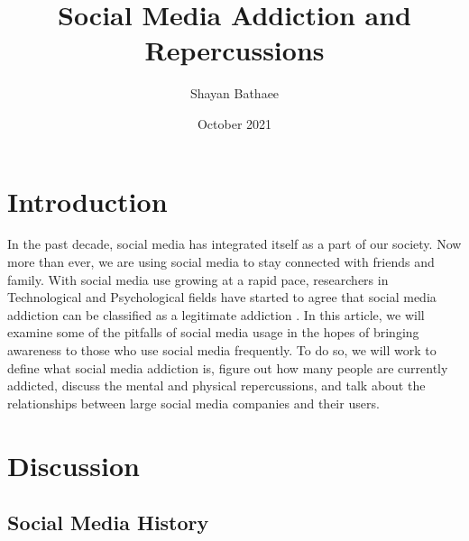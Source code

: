 \documentclass[12pt, journal, compsoc]{IEEEtran}
\title{Social Media Addiction and Repercussions}
\author{Shayan Bathaee}
\date{October 2021}
\begin{document}


\maketitle

\section{Introduction}

\hspace{12pt} In the past decade, social media has integrated itself as a part of our society. Now more than ever, we are using social media to stay connected with friends and family. With social media use growing at a rapid pace, researchers in Technological and Psychological fields have started to agree that social media addiction can be classified as a legitimate addiction \cite{UniversityStudents}. In this article, we will examine some of the pitfalls of social media usage in the hopes of bringing awareness to those who use social media frequently. To do so, we will work to define what social media addiction is, figure out how many people are currently addicted, discuss the mental and physical repercussions, and talk about the relationships between large social media companies and their users.

\section{Discussion}
\subsection{Social Media History}
\end{document}
